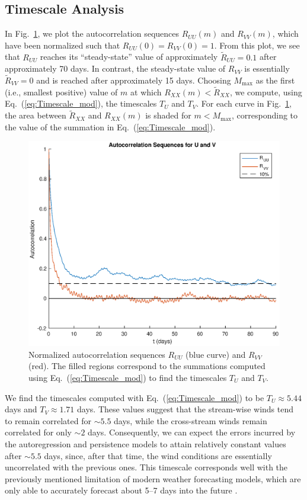 \documentclass[11pt, oneside]{article}
\newcommand{\figref}[1]{Fig.~\ref{#1}}
\newcommand{\eqnref}[1]{Eq.~(\ref{#1})}
\begin{document}
\subsection{Timescale Analysis}\label{sec:Results:Timescale}
In \figref{fig:Autocorrelations}, we plot the autocorrelation sequences $R_{UU}(m)$ and $R_{VV}(m)$, which have been normalized such that $R_{UU}(0) = R_{VV}(0) = 1$.
From this plot, we see that $R_{UU}$ reaches its ``steady-state'' value of approximately $\tilde{R}_{UU} = 0.1$ after approximately 70 days.
In contrast, the steady-state value of $R_{VV}$ is essentially $\tilde{R}_{VV} = 0$ and is reached after approximately 15 days.
Choosing $M_\text{max}$ as the first (i.e., smallest positive) value of $m$ at which $R_{XX}(m) < \tilde{R}_{XX}$, we compute, using \eqnref{eq:Timescale_mod}, the timescales $T_U$ and $T_V$.
For each curve in \figref{fig:Autocorrelations}, the area between $\tilde{R}_{XX}$ and $R_{XX}(m)$ is shaded for $m < M_\text{max}$, corresponding to the value of the summation in \eqnref{eq:Timescale_mod}.

\begin{figure}[htb]
\centering
\includegraphics[width=0.7\columnwidth]{figures/AutocorrelationSequences_90days}
\caption{Normalized autocorrelation sequences $R_{UU}$ (blue curve) and $R_{VV}$ (red).
The filled regions correspond to the summations computed using \eqnref{eq:Timescale_mod} to find the timescales $T_U$ and $T_V$.}
\label{fig:Autocorrelations}
\end{figure}

We find the timescales computed with \eqnref{eq:Timescale_mod} to be $T_U \approx 5.44$ days and $T_V \approx 1.71$ days.
These values suggest that the stream-wise winds tend to remain correlated for $\sim 5.5$ days, while the cross-stream winds remain correlated for only $\sim 2$ days.
Consequently, we can expect the errors incurred by the autoregression and persistence models to attain relatively constant values after $\sim 5.5$ days, since, after that time, the wind conditions are essentially uncorrelated with the previous ones.
This timescale corresponds well with the previously mentioned limitation of modern weather forecasting models, which are only able to accurately forecast about 5--7 days into the future \citep[Sec.~1.2]{Giebel2011}.
\end{document}
